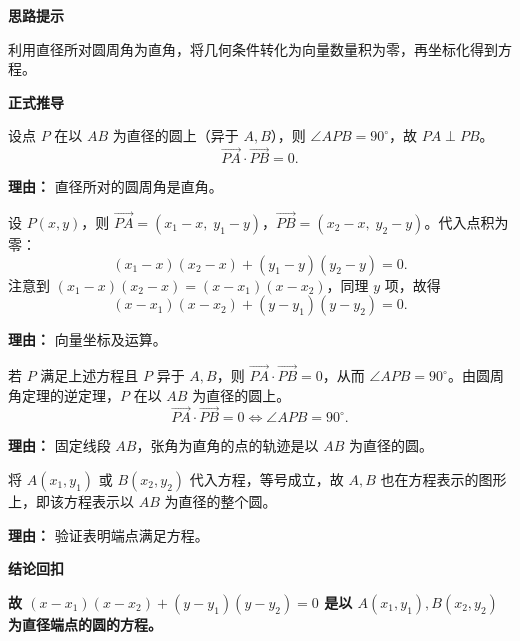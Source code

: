 \begin{proofbox}
	\textbf{\textcolor{CProof}{思路提示}}

	利用直径所对圆周角为直角，将几何条件转化为向量数量积为零，再坐标化得到方程。

	\medskip
	\textbf{\textcolor{CProof}{正式推导}}
	\begin{description}[style=nextline, leftmargin=2.8em, labelsep=0.5em, itemsep=0.55em]
		\item[\textbf{步骤一（垂直条件转化）：}] 设点 $P$ 在以 $AB$ 为直径的圆上（异于 $A,B$），则 $\angle APB=90^\circ$，故 $PA\perp PB$。
			\[
				\overrightarrow{PA}\cdot\overrightarrow{PB}=0.
			\]
			\par\textbf{理由：} 直径所对的圆周角是直角。

		\item[\textbf{步骤二（坐标化点积）：}] 设 $P(x,y)$，则 $\overrightarrow{PA}=(x_1-x,\;y_1-y)$，$\overrightarrow{PB}=(x_2-x,\;y_2-y)$。代入点积为零：
			\[
				(x_1-x)(x_2-x)+(y_1-y)(y_2-y)=0.
			\]
			注意到 $(x_1-x)(x_2-x)=(x-x_1)(x-x_2)$，同理 $y$ 项，故得
			\[
				(x-x_1)(x-x_2)+(y-y_1)(y-y_2)=0.
			\]
			\par\textbf{理由：} 向量坐标及运算。

		\item[\textbf{步骤三（反向推导）：}] 若 $P$ 满足上述方程且 $P$ 异于 $A,B$，则 $\overrightarrow{PA}\cdot\overrightarrow{PB}=0$，从而 $\angle APB=90^\circ$。由圆周角定理的逆定理，$P$ 在以 $AB$ 为直径的圆上。
			\[
				\overrightarrow{PA}\cdot\overrightarrow{PB}=0 \iff \angle APB=90^\circ.
			\]
			\par\textbf{理由：} 固定线段 $AB$，张角为直角的点的轨迹是以 $AB$ 为直径的圆。

		\item[\textbf{步骤四（边界补充）：}] 将 $A(x_1,y_1)$ 或 $B(x_2,y_2)$ 代入方程，等号成立，故 $A,B$ 也在方程表示的图形上，即该方程表示以 $AB$ 为直径的整个圆。
			\par\textbf{理由：} 验证表明端点满足方程。
	\end{description}

	\medskip
	\textbf{\textcolor{CProof}{结论回扣}}

	\textbf{故 $(x-x_1)(x-x_2)+(y-y_1)(y-y_2)=0$ 是以 $A(x_1,y_1),B(x_2,y_2)$ 为直径端点的圆的方程。}
\end{proofbox}
